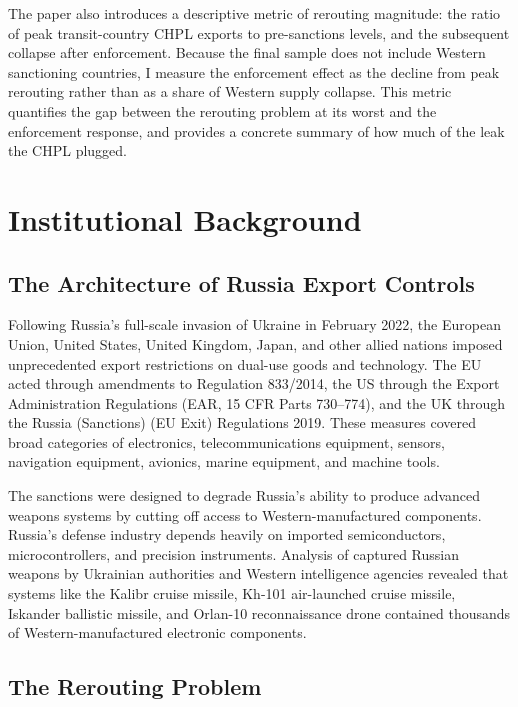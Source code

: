 \documentclass[12pt]{article}
\begin{document}
The paper also introduces a descriptive metric of rerouting magnitude: the ratio of peak transit-country CHPL exports to pre-sanctions levels, and the subsequent collapse after enforcement. Because the final sample does not include Western sanctioning countries, I measure the enforcement effect as the decline from peak rerouting rather than as a share of Western supply collapse. This metric quantifies the gap between the rerouting problem at its worst and the enforcement response, and provides a concrete summary of how much of the leak the CHPL plugged.


\section{Institutional Background}
\label{sec:background}

\subsection{The Architecture of Russia Export Controls}

Following Russia's full-scale invasion of Ukraine in February 2022, the European Union, United States, United Kingdom, Japan, and other allied nations imposed unprecedented export restrictions on dual-use goods and technology. The EU acted through amendments to Regulation 833/2014, the US through the Export Administration Regulations (EAR, 15 CFR Parts 730--774), and the UK through the Russia (Sanctions) (EU Exit) Regulations 2019. These measures covered broad categories of electronics, telecommunications equipment, sensors, navigation equipment, avionics, marine equipment, and machine tools.

The sanctions were designed to degrade Russia's ability to produce advanced weapons systems by cutting off access to Western-manufactured components. Russia's defense industry depends heavily on imported semiconductors, microcontrollers, and precision instruments. Analysis of captured Russian weapons by Ukrainian authorities and Western intelligence agencies revealed that systems like the Kalibr cruise missile, Kh-101 air-launched cruise missile, Iskander ballistic missile, and Orlan-10 reconnaissance drone contained thousands of Western-manufactured electronic components.

\subsection{The Rerouting Problem}
\end{document}
